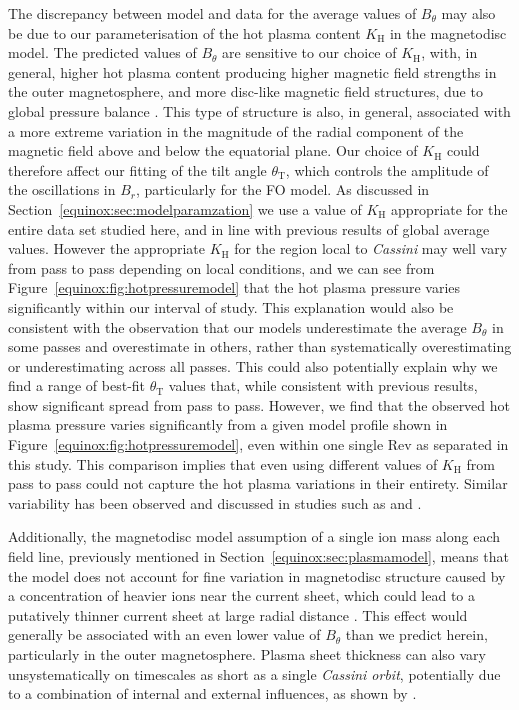 The discrepancy between model and data for the average values of $B_{\theta}$ may also be due to our parameterisation of the hot plasma content $K_\mathrm{H}$ in the magnetodisc model. The predicted values of $B_{\theta}$ are sensitive to our choice of $K_\mathrm{H}$, with, in general, higher hot plasma content producing higher magnetic field strengths in the outer magnetosphere, and more disc-like magnetic field structures, due to global pressure balance \citep[see][]{achilleos2010b,sorba2017}. This type of structure is also, in general, associated with a more extreme variation in the magnitude of the radial component of the magnetic field above and below the equatorial plane. Our choice of $K_\mathrm{H}$ could therefore affect our fitting of the tilt angle $\theta_\mathrm{T}$, which controls the amplitude of the oscillations in $B_r$, particularly for the FO model. As discussed in Section~\ref{equinox:sec:modelparamzation} we use a value of $K_\mathrm{H}$ appropriate for the entire data set studied here, and in line with previous results of global average values. However the appropriate $K_\mathrm{H}$ for the region local to \textit{Cassini} may well vary from pass to pass depending on local conditions, and we can see from Figure~\ref{equinox:fig:hotpressuremodel} that the hot plasma pressure varies significantly within our interval of study. This explanation would also be consistent with the observation that our models underestimate the average $B_{\theta}$ in some passes and overestimate in others, rather than systematically overestimating or underestimating across all passes. This could also potentially explain why we find a range of best-fit $\theta_\mathrm{T}$ values that, while consistent with previous results, show significant spread from pass to pass. However, we find that the observed hot plasma pressure varies significantly from a given model profile shown in Figure~\ref{equinox:fig:hotpressuremodel}, even within one single Rev as separated in this study. This comparison implies that even using different values of $K_\mathrm{H}$ from pass to pass could not capture the hot plasma variations in their entirety. Similar variability has been observed and discussed in studies such as \citet{sergis2007} and \citet{kellett2010}.

Additionally, the magnetodisc model assumption of a single ion mass along each field line, previously mentioned in Section~\ref{equinox:sec:plasmamodel}, means that the model does not account for fine variation in magnetodisc structure caused by a concentration of heavier ions near the current sheet, which could lead to a putatively thinner current sheet at large radial distance \citep{nemeth2011}. This effect would generally be associated with an even lower value of $B_{\theta}$ than we predict herein, particularly in the outer magnetosphere. Plasma sheet thickness can also vary unsystematically on timescales as short as a single \textit{Cassini orbit}, potentially due to a combination of internal and external influences, as shown by \citet{sergis2011}.

